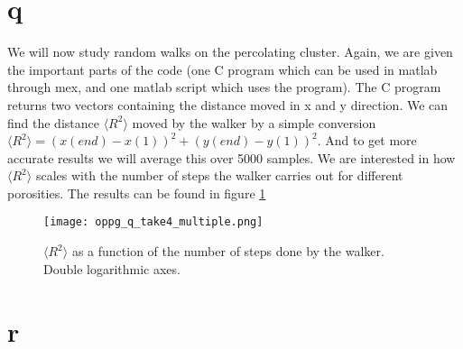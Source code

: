 \documentclass[a4paper,english, 10pt, twoside]{article}
\begin{document}
\section{q}
We will now study random walks on the percolating cluster. Again, we are given the important parts of the code (one C 
program which can be used in matlab through mex, and one matlab script which uses the program). The C program returns 
two vectors containing the distance moved in x and y direction. We can find the distance $\langle R^2\rangle$ moved 
by the walker by a simple conversion $\langle R^2\rangle = (x(end)-x(1))^2 + (y(end)-y(1))^2$. And to get more accurate 
results we will average this over 5000 samples. We are interested in how $\langle R^2\rangle$ scales with the number of 
steps the walker carries out for different porosities. The results can be found in figure \ref{rsquared} 

\begin{figure}[H]
 \centering
 \texttt{[image: oppg\_q\_take4\_multiple.png]}
 \caption{$\langle R^2\rangle$ as a function of the number of steps done by the walker. Double logarithmic axes.}
 \label{rsquared}
\end{figure}

\section{r}
\end{document}
